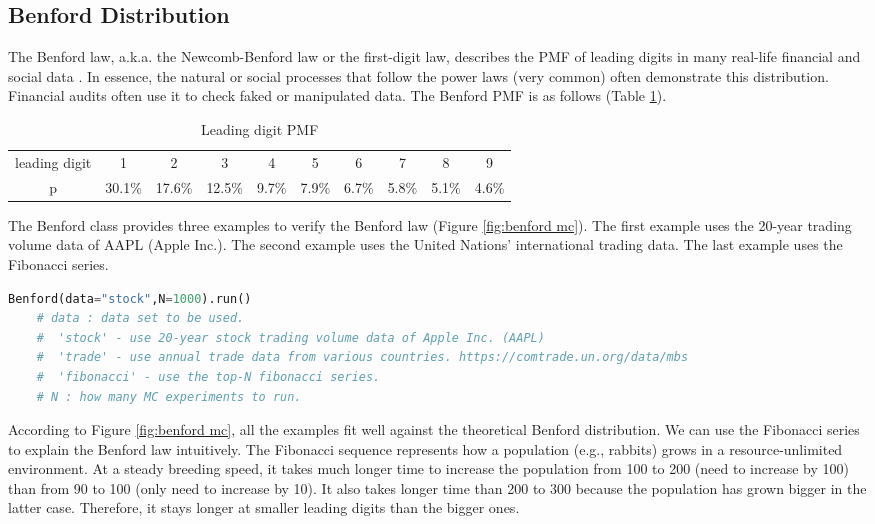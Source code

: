 \documentclass[11pt, letterpaper]{article}
\begin{document}
\subsection{Benford Distribution}
The Benford law, a.k.a. the Newcomb-Benford law or the first-digit law, describes the PMF of
leading digits in many real-life financial and social data \cite{bib15}. In essence, the natural or social
processes that follow the power laws (very common) often demonstrate this distribution.
Financial audits often use it to check faked or manipulated data. The Benford PMF is as follows (Table \ref{tab:benford p}).

\begin{table}[htbp] \footnotesize
    \centering
    \caption{Leading digit PMF}\label{tab:benford p}
    \begin{tabular}{cccccccccc}
        \hline
        leading digit & 1      & 2      & 3      & 4     & 5     & 6     & 7     & 8     & 9     \\
        p             & 30.1\% & 17.6\% & 12.5\% & 9.7\% & 7.9\% & 6.7\% & 5.8\% & 5.1\% & 4.6\% \\
        \hline
    \end{tabular}
\end{table}

The Benford class provides three examples to verify the Benford law (Figure \ref{fig:benford mc}).
The first example uses the 20-year trading volume data of AAPL (Apple Inc.). The second example
uses the United Nations' international trading data. The last example uses the Fibonacci series.

\lstset{
    basicstyle=\footnotesize,
    xleftmargin=-1em,aboveskip=0.5em,belowskip=0.5em
}
\begin{lstlisting}[language=python]
    Benford(data="stock",N=1000).run()
    # data : data set to be used.
    #  'stock' - use 20-year stock trading volume data of Apple Inc. (AAPL)
    #  'trade' - use annual trade data from various countries. https://comtrade.un.org/data/mbs
    #  'fibonacci' - use the top-N fibonacci series.    
    # N : how many MC experiments to run.
    \end{lstlisting}

According to Figure \ref{fig:benford mc}, all the examples fit well against the theoretical Benford distribution.
We can use the Fibonacci series to explain the Benford law intuitively. The Fibonacci sequence
represents how a population (e.g., rabbits) grows in a resource-unlimited environment.
At a steady breeding speed, it takes much longer time to increase the population from 100 to 200
(need to increase by 100) than from 90 to 100 (only need to increase by 10). It also takes longer
time than 200 to 300 because the population has grown bigger in the latter case. Therefore, it stays longer
at smaller leading digits than the bigger ones.
\end{document}

